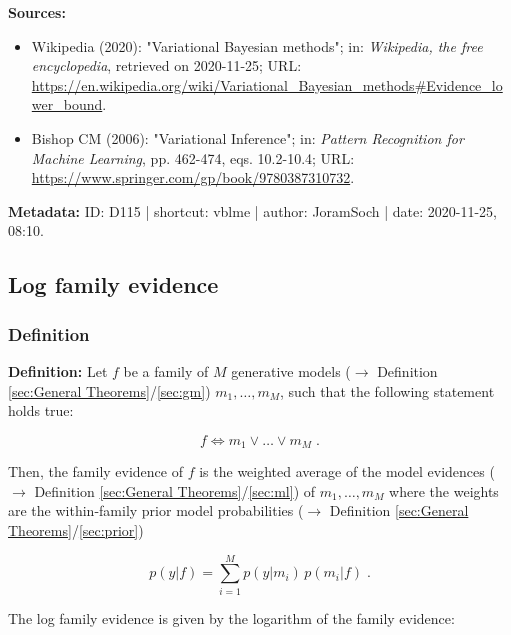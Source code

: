 \documentclass[a4paper,12pt,twoside]{book}
\begin{document}
\vspace{1em}
\textbf{Sources:}
\begin{itemize}
\item Wikipedia (2020): "Variational Bayesian methods"; in: \textit{Wikipedia, the free encyclopedia}, retrieved on 2020-11-25; URL: \url{https://en.wikipedia.org/wiki/Variational_Bayesian_methods#Evidence_lower_bound}.
\item Bishop CM (2006): "Variational Inference"; in: \textit{Pattern Recognition for Machine Learning}, pp. 462-474, eqs. 10.2-10.4; URL: \url{https://www.springer.com/gp/book/9780387310732}.
\end{itemize}


\vspace{1em}
\textbf{Metadata:} ID: D115 | shortcut: vblme | author: JoramSoch | date: 2020-11-25, 08:10.
\vspace{1em}



\subsection{Log family evidence}

\subsubsection[\textit{Definition}]{Definition} \label{sec:lfe}
\setcounter{equation}{0}

\textbf{Definition:} Let $f$ be a family of $M$ generative models ($\rightarrow$ Definition \ref{sec:General Theorems}/\ref{sec:gm}) $m_1, \ldots, m_M$, such that the following statement holds true:

\begin{equation} \label{eq:lfe-fam}
f \Leftrightarrow m_1 \vee \ldots \vee m_M \; .
\end{equation}

Then, the family evidence of $f$ is the weighted average of the model evidences ($\rightarrow$ Definition \ref{sec:General Theorems}/\ref{sec:ml}) of $m_1, \ldots, m_M$ where the weights are the within-family prior model probabilities ($\rightarrow$ Definition \ref{sec:General Theorems}/\ref{sec:prior})

\begin{equation} \label{eq:lfe-fe}
p(y|f) = \sum_{i=1}^M p(y|m_i) \, p(m_i|f) \; .
\end{equation}

The log family evidence is given by the logarithm of the family evidence:
\end{document}
